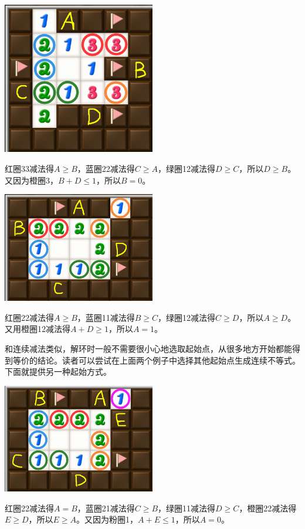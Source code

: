 \vspace{5mm}
\begin{center}
    \includegraphics[width=0.5\textwidth]{trick/环2.png}
\end{center}
红圈33减法得$A\ge B$，蓝圈22减法得$C\ge A$，绿圈12减法得$D\ge C$，所以$D\ge B$。又因为橙圈3，$B+D\le 1$，所以$B=0$。

\vspace{5mm}
\begin{center}
    \includegraphics[width=0.5\textwidth]{trick/环3.png}
\end{center}
红圈22减法得$A\ge B$，蓝圈11减法得$B\ge C$，绿圈12减法得$C\ge D$，所以$A\ge D$。又用橙圈12减法得$A+D\ge 1$，所以$A=1$。

和连续减法类似，解环时一般不需要很小心地选取起始点，从很多地方开始都能得到等价的结论。读者可以尝试在上面两个例子中选择其他起始点生成连续不等式。下面就提供另一种起始方式。

\vspace{5mm}
\begin{center}
    \includegraphics[width=0.5\textwidth]{trick/环4.png}
\end{center}
红圈22减法得$A=B$，蓝圈21减法得$C\ge B$，绿圈11减法得$D\ge C$，橙圈22减法得$E\ge D$，所以$E\ge A$。又因为粉圈1，$A+E\le 1$，所以$A=0$。

